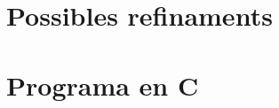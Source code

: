 \documentclass{article}
\theoremstyle{definition}
\newcommand{\0}{\ensuremath{\vb{0}}}
\begin{document}
\section{Possibles refinaments}

\printbibliography[heading=bibintoc]
\appendix
\section{Programa en C}\label{appendix1}
%
\end{document}
